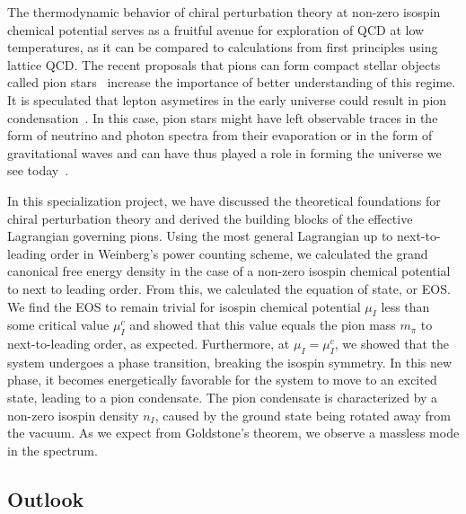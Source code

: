 The thermodynamic behavior of chiral perturbation theory at non-zero isospin chemical potential serves as a fruitful avenue for exploration of QCD at low temperatures, as it can be compared to calculations from first principles using lattice QCD.
The recent proposals that pions can form compact stellar objects called pion stars~\cite{new_clas_of_compact_stars,andersen:bose_einstein} increase the importance of better understanding of this regime.
It is speculated that lepton asymetires in the early universe could result in pion condensation~\cite{new_clas_of_compact_stars,abduki:Pion_condensation_in_a_dense_neutrino_gas,Wygas:Cosmic_QCD_Epoch_at_Nonvanishing_Lepton_Asymmetry,Schwarz_2009:Lepton_asymmetry_and_the_cosmic_QCD_transition}.
In this case, pion stars might have left observable traces in the form of neutrino and photon spectra from their evaporation or in the form of gravitational waves and can have thus played a role in forming the universe we see today~\cite{new_clas_of_compact_stars}.

In this specialization project, we have discussed the theoretical foundations for chiral perturbation theory and derived the building blocks of the effective Lagrangian governing pions.
Using the most general Lagrangian up to next-to-leading order in Weinberg's power counting scheme, we calculated the grand canonical free energy density in the case of a non-zero isospin chemical potential to next to leading order.
From this, we calculated the equation of state, or EOS.
We find the EOS to remain trivial for isospin chemical potential $\mu_I$ less than some critical value $\mu_I^c$ and showed that this value equals the pion mass $m_\pi$ to next-to-leading order, as expected.
Furthermore, at $\mu_I = \mu_I^c$, we showed that the system undergoes a phase transition, breaking the isospin symmetry.
In this new phase, it becomes energetically favorable for the system to move to an excited state, leading to a pion condensate.
The pion condensate is characterized by a non-zero isospin density $n_I$, caused by the ground state being rotated away from the vacuum.
As we expect from Goldstone's theorem, we observe a massless mode in the spectrum.


\subsection*{Outlook}

